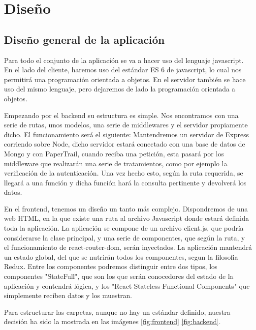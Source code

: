 \chapter{Diseño}
\section{Diseño general de la aplicación}
Para todo el conjunto de la aplicación se va a hacer uso del lenguaje javascript. En el lado del cliente, haremos uso del estándar ES 6 de javascript, lo cual nos permitirá una programación orientada a objetos. En el servidor también se hace uso del mismo lenguaje, pero dejaremos de lado la programación orientada a objetos.

Empezando por el backend su estructura es simple. Nos encontramos con una serie de rutas, unos modelos, una serie de middlewares y el servidor propiamente dicho. El funcionamiento será el siguiente: Mantendremos un servidor de Express corriendo sobre Node, dicho servidor estará conectado con una base de datos de Mongo y con PaperTrail, cuando reciba una petición, esta pasará por los middleware que realizarán una serie de tratamientos, como por ejemplo la verificación de la autenticación. Una vez hecho esto, según la ruta requerida, se llegará a una función y dicha función hará la consulta pertinente y devolverá los datos.

En el frontend, tenemos un diseño un tanto más complejo. Dispondremos de una web HTML, en la que existe una ruta al archivo Javascript donde estará definida toda la aplicación. La aplicación se compone de un archivo client.js, que podría considerarse la clase principal, y una serie de componentes, que según la ruta, y el funcionamiento de react-router-dom, serán inyectados. La aplicación mantendrá un estado global, del que se nutrirán todos los componentes, segun la filosofia Redux. Entre los componentes podremos distinguir entre dos tipos, los componentes "StateFull", que son los que serán conocedores del estado de la aplicación y contendrá lógica, y los "React Stateless Functional Components" que simplemente reciben datos y los muestran.


Para estructurar las carpetas, aunque no hay un estándar definido, nuestra decisión ha sido la mostrada en las imágenes \ref{fig:frontend} \ref{fig:backend}.

